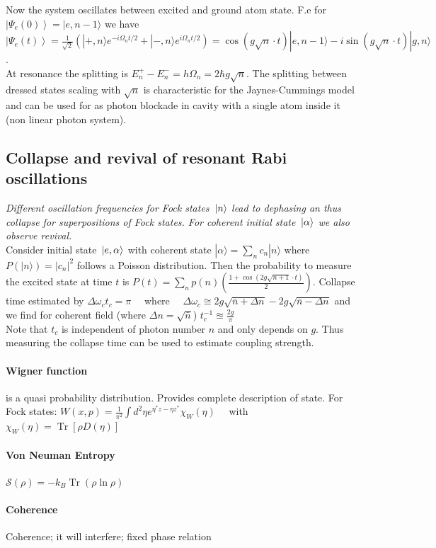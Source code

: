 Now the system oscillates between excited and ground atom state. F.e for $\left|\Psi_e(0)\right\rangle=|e, n-1\rangle$ we have $\left|\Psi_e(t)\right\rangle=\frac{1}{\sqrt{2}}\left(|+, n\rangle e^{-i \Omega_n t / 2}+|-, n\rangle e^{i \Omega_n t / 2}\right)
=\cos (g \sqrt{n} \cdot t)|e, n-1\rangle-i \sin (g \sqrt{n} \cdot t)|g, n\rangle$.\\

At resonance the splitting is $E_n^{+}-E_n^{-}=h \Omega_n=2 \hbar g \sqrt{n}$. The splitting between dressed states scaling with $\sqrt{n}$ is characteristic 
for the Jaynes-Cummings model and can be used for as photon blockade in cavity with a single atom inside it (non linear photon system).\\

\subsection{Collapse and revival of resonant Rabi oscillations}
\emph{Different oscillation frequencies for Fock states $\ket*{n}$ lead to dephasing an thus collapse for superpositions of Fock states. 
For coherent initial state $\ket*{\alpha}$ we also observe revival.}\\

Consider initial state $\ket*{e, \alpha}$ with coherent state $|\alpha\rangle=\sum_n c_n|n\rangle$ where $P(|n\rangle)=\left|c_n\right|^2$ follows a Poisson distribution.
Then the probability to measure the excited state at time $t$ is $P(t) =\sum_n p(n)\left(\frac{1+\cos (2 g \sqrt{n+1} \cdot t)}{2}\right)$. 
Collapse time estimated by $\Delta \omega_c t_c=\pi \quad$ where $\quad \Delta \omega_c \cong 2 g \sqrt{\bar{n}+\Delta n}-2 g \sqrt{\bar{n}-\Delta n}$
and we find for coherent field (where $\Delta n=\sqrt{\bar{n}}$) $t_c^{-1} \approxeq \frac{2 g}{\pi}$\\
Note that $t_c$ is independent of photon number $n$ and only depends on $g$. Thus measuring the collapse time can be used to estimate coupling strength.

\paragraph{Wigner function} is a quasi probability distribution. Provides complete description of state. 
For Fock states: $W(x, p)=\frac{1}{\pi^2} \int d^2 \eta e^{\eta^* z-\eta z^*} \chi_W(\eta) \quad $ with $\chi_W(\eta)=\operatorname{Tr}[\rho D(\eta)]$ 

\paragraph{Von Neuman Entropy}$\mathcal{S}(\rho)=-k_B \operatorname{Tr}(\rho \ln \rho)$

\paragraph{Coherence} Coherence; it will interfere; fixed phase relation 


